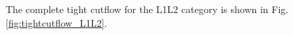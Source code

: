 The complete tight cutflow for the L1L2 category is shown in Fig. \ref{fig:tightcutflow_L1L2}.






